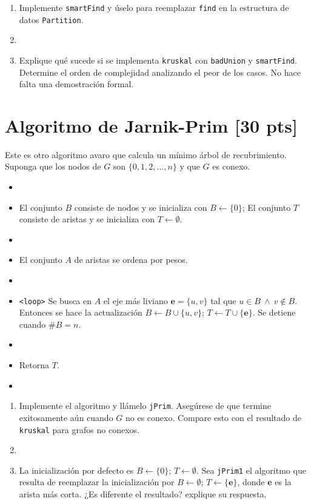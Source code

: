 \begin{enumerate}
    \item Implemente \texttt{smartFind} y úselo para reemplazar \texttt{find} en la estructura de datos \texttt{Partition}.
    \item[] 
    \item Explique qué sucede si se implementa \texttt{kruskal} con \texttt{badUnion} y \texttt{smartFind}. Determine el orden de complejidad analizando el peor de los casos. No hace falta una demostración formal.
\end{enumerate}

\section{Algoritmo de Jarnik-Prim [\textbf{30 pts}]}
Este es otro algoritmo avaro que calcula un mínimo árbol de recubrimiento. Suponga que los nodos de $G$ son $\{0,1,2,...,n\}$ y que $G$ es conexo.

\begin{itemize}
    \item[] 
    \item El conjunto $B$ consiste de nodos y se inicializa con $B \leftarrow \{0\}$; El conjunto $T$ consiste de aristas y se inicializa con $T \leftarrow \emptyset$.
    \item[] 
    \item El conjunto $A$ de aristas se ordena por pesos.
    \item[] 
    \item \texttt{<loop>} Se busca en $A$ el eje más liviano $\mathbf{e} = \{u,v\}$ tal que $u \in B \ \land \ v \notin B$. Entonces se hace la actualización $B \leftarrow B \cup \{u,v\}$; $T \leftarrow T \cup \{\mathbf{e}\}$. Se detiene cuando $\# B = n$.
    \item[] 
    \item Retorna $T$.
    \item[] 
\end{itemize}

\begin{enumerate}
    \item Implemente el algoritmo y llámelo \texttt{jPrim}. Asegúrese de que termine exitosamente aún cuando $G$ no es conexo. Compare esto con el resultado de \texttt{kruskal} para grafos no conexos.
    \item[] 
    \item La inicialización por defecto es $B \leftarrow \{0\}$; $T \leftarrow \emptyset$. Sea \texttt{jPrim1} el algoritmo que resulta de reemplazar la inicialización por $B \leftarrow \emptyset$; $T \leftarrow \{\mathbf{e}\}$, donde \textbf{e} es la arista más corta. ¿Es diferente el resultado? explique su respuesta.
\end{enumerate}


